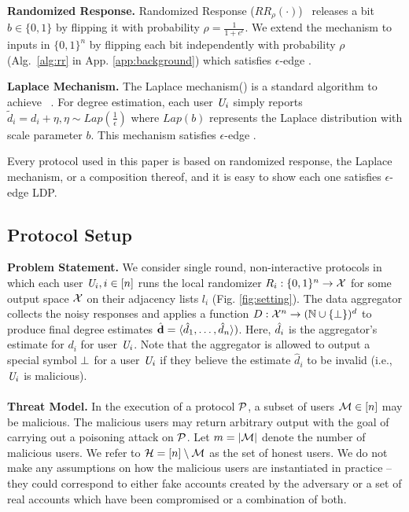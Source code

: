 \noindent\textbf{Randomized Response.} Randomized Response ($RR_\rho(\cdot)$)~\cite{RR} releases a bit $b \in \{0,1\}$ by
flipping it with probability $\rho = \frac{1}{1+e^\epsilon}$. We extend the
mechanism to inputs in $\{0,1\}^n$ by flipping each bit independently with
probability $\rho$ (Alg.~\ref{alg:rr} in App. \ref{app:background}) which satisfies
 $\epsilon$-edge \DP. 
 
\noindent\textbf{Laplace Mechanism.} 
The Laplace mechanism(\RLap) is a standard algorithm to achieve \DP~\cite{Dwork}. For degree estimation, each user $\textit{U}_i$ simply reports $\tilde{d}_i=d_i+\eta, \eta \sim Lap(\frac{1}{\epsilon})$ where $Lap(b)$ represents the Laplace distribution with scale parameter $b$. This mechanism satisfies $\epsilon$-edge \DP. 

Every protocol used in this paper is based on randomized response, the Laplace mechanism, or a composition thereof, and it is easy to show each one satisfies $\epsilon$-edge LDP.

\subsection{Protocol Setup}
\noindent\textbf{Problem Statement.}  
We consider single round,  non-interactive protocols in which each user $\textit{U}_i, i \in [n]$ runs the local randomizer
$R_i : \{0,1\}^n \rightarrow \mathcal{X}$ for some output space $\mathcal{X}$ on their adjacency lists $l_i$ (Fig. \ref{fig:setting}). The data aggregator collects the noisy responses and applies a function 
$D : \mathcal{X}^n \rightarrow (\mathbb{N} \cup \{\perp\})^d$ to produce final degree estimates  $\hat{\textbf{d}}=\langle \hat{d}_1, \ldots, \hat{d}_n\rangle)$. Here, $\hat{d}_i$ is the aggregator's estimate for $d_i$ for user $\textit{U}_i$. Note that the aggregator is allowed to output a special symbol $\perp$ for a user $\textit{U}_i$ if they believe the estimate $\hat{d}_i$ to be invalid (i.e., $\textit{U}_i$ is malicious).
  \vspace{-0.2cm}  \\\\
\noindent\textbf{Threat Model.}
In the execution of a protocol $\mathcal{P}$, a subset of users $\mathcal{M} \in [n]$ may be malicious. The malicious users may return arbitrary output with the goal of carrying out a poisoning attack on  $\mathcal{P}$. Let
$m=|\mathcal{M}|$ denote the number of malicious users. We refer to 
$\mathcal{H} = [n] \setminus \mathcal{M}$ as the set of honest users.
We do not make any assumptions on how the malicious users are instantiated in practice -- they could correspond to either fake accounts created by the adversary or a set of real accounts which have been compromised or a combination of both. 


